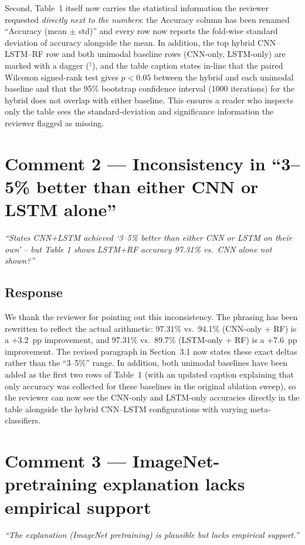 \documentclass[11pt,a4paper]{article}
\begin{document}
Second, Table~1 itself now carries the statistical information the reviewer requested \emph{directly next to the numbers}: the Accuracy column has been renamed ``Accuracy (mean $\pm$ std)'' and every row now reports the fold-wise standard deviation of accuracy alongside the mean. In addition, the top hybrid CNN--LSTM--RF row and both unimodal baseline rows (CNN-only, LSTM-only) are marked with a dagger ($^{\dagger}$), and the table caption states in-line that the paired Wilcoxon signed-rank test gives $p < 0.05$ between the hybrid and each unimodal baseline and that the 95\% bootstrap confidence interval (1000 iterations) for the hybrid does not overlap with either baseline. This ensures a reader who inspects only the table sees the standard-deviation and significance information the reviewer flagged as missing.

\section*{Comment 2 — Inconsistency in ``3--5\% better than either CNN or LSTM alone''}
\textit{``States CNN+LSTM achieved `3--5\% better than either CNN or LSTM on their own' -- but Table 1 shows LSTM+RF accuracy 97.31\% vs.\ CNN alone not shown?''}

\subsection*{Response}
We thank the reviewer for pointing out this inconsistency. The phrasing has been rewritten to reflect the actual arithmetic: 97.31\% vs.\ 94.1\% (CNN-only + RF) is a $+3.2$~pp improvement, and 97.31\% vs.\ 89.7\% (LSTM-only + RF) is a $+7.6$~pp improvement. The revised paragraph in Section~3.1 now states these exact deltas rather than the ``3--5\%'' range. In addition, both unimodal baselines have been added as the first two rows of Table~1 (with an updated caption explaining that only accuracy was collected for these baselines in the original ablation sweep), so the reviewer can now see the CNN-only and LSTM-only accuracies directly in the table alongside the hybrid CNN--LSTM configurations with varying meta-classifiers.

\section*{Comment 3 — ImageNet-pretraining explanation lacks empirical support}
\textit{``The explanation (ImageNet pretraining) is plausible but lacks empirical support.''}
\end{document}
